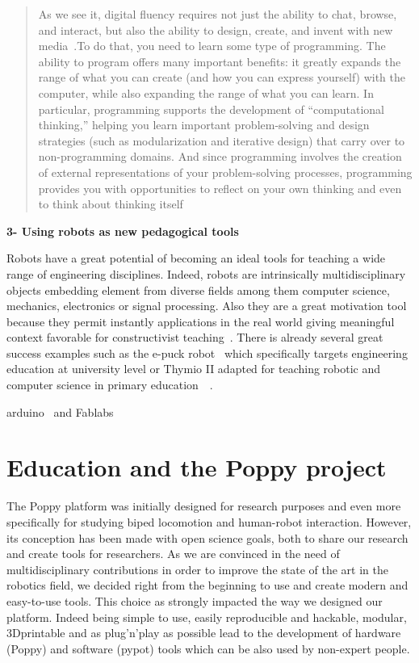 \begin{quotation}
    As we see it, digital fluency requires not just the ability to chat, browse, and interact, but also the ability to design, create, and invent with new media~\cite{resnick2008sowing}.To do that, you need to learn some type of programming. The ability to program offers many important benefits: it greatly expands the range of what you can create (and how you can express yourself) with the computer, while also expanding the range of what you can learn. In particular, programming supports the development of “computational thinking,” helping you learn important problem-solving and design strategies (such as modularization and iterative design) that carry over to non-programming domains. And since programming involves the creation of external representations of your problem-solving processes, programming provides you with opportunities to reflect on your own thinking and even to think about thinking itself~\cite{disessa2001changing}


\end{quotation}


\textbf{3- Using robots as new pedagogical tools}

Robots have a great potential of becoming an ideal tools for teaching a wide range of engineering disciplines. Indeed, robots are intrinsically multidisciplinary objects embedding element from diverse fields among them computer science, mechanics, electronics or signal processing. Also they are a great motivation tool because they permit instantly applications in the real world giving meaningful context favorable for constructivist teaching~\cite{palincsar1998social}. There is already several great success examples such as the e-puck robot~\cite{mondada2009puck} which specifically targets engineering education at university level or Thymio II adapted for teaching robotic and computer science in primary education~\cite{riedo2012two}~\cite{riedo2013thymio}.

arduino~\cite{mellis2007arduino} and Fablabs



\section{Education and the Poppy project} %

The Poppy platform was initially designed for research purposes and even more specifically for studying biped locomotion and human-robot interaction. However, its conception has been made with open science goals, both to share our research and create tools for researchers. As we are convinced in the need of multidisciplinary contributions in order to improve the state of the art in the robotics field, we decided right from the beginning to use and create modern and easy-to-use tools. This choice as strongly impacted the way we designed our platform. Indeed being simple to use, easily reproducible and hackable, modular, 3Dprintable and as plug'n'play as possible lead to the development of hardware (Poppy) and software (pypot) tools which can be also used by non-expert people.

